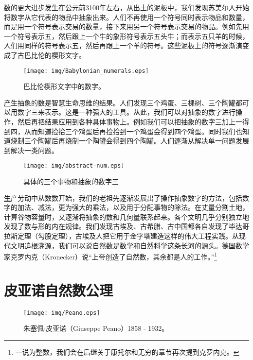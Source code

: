 \documentclass[UTF8]{article}
\begin{document}
\underline{数}的更大进步发生在公元前3100年左右，从出土的泥板中，我们发现苏美尔人开始将数字从它代表的物品中抽象出来。人们不再使用一个符号同时表示物品和数量，而是用一个符号表示交易的数量，接下来用另一个符号表示交易的物品。例如先用一个符号表示五，然后跟上一个牛的象形符号表示五头牛；而表示五只羊的时候，人们用同样的符号表示五，然后再跟上一个羊的符号。这些泥板上的符号逐渐演变成了古巴比伦的楔形文字。

\begin{figure}[htbp]
 \centering
 \texttt{[image: img/Babylonian\_numerals.eps]}
 \caption{巴比伦楔形文字中的数字\cite{wiki-babylonian-num}。}
 \label{fig:babylonian-num}
\end{figure}

\underline{产}生抽象的数是智慧生命思维的结果。人们发现三个鸡蛋、三棵树、三个陶罐都可以用数字三来表示。这是一种强大的工具。从此，我们可以对抽象的数字进行操作，然后再把结果应用到各种具体事物上。例如我们可以把抽象的数字三加上一得到四，从而知道捡拾三个鸡蛋后再捡拾到一个鸡蛋会得到四个鸡蛋。同时我们也知道烧制三个陶罐后再烧制一个陶罐会得到四个陶罐。人们逐渐从解决单一问题发展到解决一类问题。

\begin{figure}[htbp]
 \centering
 \texttt{[image: img/abstract-num.eps]}
 \caption{具体的三个事物和抽象的数字三}
 \label{fig:abstract-num}
\end{figure}

\underline{生}产劳动中从数数开始，我们的老祖先逐渐发展出了操作抽象数字的方法，包括数字的加法、减法，更为强大的乘法，以及用于分配事物的除法。在丈量分割土地，计算谷物容量时，又逐渐将抽象的数和几何量联系起来。各个文明几乎分别独立地发现了数与形的内在规律。我们发现古埃及、古希腊、古中国都各自发现了毕达哥拉斯定理（勾股定理），古埃及人把它用于金字塔建造这样的伟大工程实践。从现代文明追根溯源，我们可以说自然数是数学和自然科学这条长河的源头。德国数学家克罗内克（Kronecker）说“上帝创造了自然数，其余都是人的工作。”\footnote{一说为整数，我们会在后继关于康托尔和无穷的章节再次提到克罗内克。}

\section{皮亚诺自然数公理}

\begin{figure}[htbp]
 \centering
 \texttt{[image: img/Peano.eps]}
 \caption{朱塞佩$\cdot$皮亚诺（Giuseppe Peano）1858 - 1932。}
 \label{fig:Peano}
\end{figure}
\end{document}
